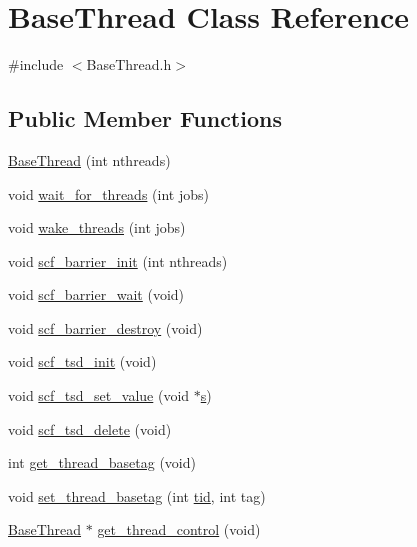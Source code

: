\hypertarget{class_base_thread}{\section{Base\-Thread Class Reference}
\label{class_base_thread}
}


{\ttfamily \#include $<$Base\-Thread.\-h$>$}

\subsection*{Public Member Functions}
\begin{DoxyCompactItemize}
\item 
\hyperlink{class_base_thread_a2496ab7dd9e8aa2bde8709fea2ed0dce}{Base\-Thread} (int nthreads)
\item 
void \hyperlink{class_base_thread_a84da2cf16b7c961408fc918e570af25b}{wait\-\_\-for\-\_\-threads} (int jobs)
\item 
void \hyperlink{class_base_thread_a197bd8968933e01c59c1be78b8e1c4ec}{wake\-\_\-threads} (int jobs)
\item 
void \hyperlink{class_base_thread_a06cab1e53ad7443ddbcbc0115cf3694b}{scf\-\_\-barrier\-\_\-init} (int nthreads)
\item 
void \hyperlink{class_base_thread_a4273b3cfab78ed0653c546fb319bd7ba}{scf\-\_\-barrier\-\_\-wait} (void)
\item 
void \hyperlink{class_base_thread_a39166fc96cb44bcdc079ed988d7c9944}{scf\-\_\-barrier\-\_\-destroy} (void)
\item 
void \hyperlink{class_base_thread_aedba8eb36afb4458d3fd1fd60560de28}{scf\-\_\-tsd\-\_\-init} (void)
\item 
void \hyperlink{class_base_thread_a56e6092609219fde2a1207210e9dc890}{scf\-\_\-tsd\-\_\-set\-\_\-value} (void $\ast$\hyperlink{_t_d_d_f_t_2_common_2init__wf__gaussian_8c_ac9562ee4ecb3b8aeebeb04656e7e57a9}{s})
\item 
void \hyperlink{class_base_thread_ac63a5f3c5f7a8f67f8ac7919ec9971ef}{scf\-\_\-tsd\-\_\-delete} (void)
\item 
int \hyperlink{class_base_thread_ae38c5f1a361e8342630cf0193f8a2d6b}{get\-\_\-thread\-\_\-basetag} (void)
\item 
void \hyperlink{class_base_thread_a30c8cbc148d172aff2f2d3b0ebf4ff14}{set\-\_\-thread\-\_\-basetag} (int \hyperlink{class_base_thread_a98cb2fa092cfd40fcdc3992096e58db8}{tid}, int tag)
\item 
\hyperlink{class_base_thread}{Base\-Thread} $\ast$ \hyperlink{class_base_thread_afdcaf00c72f5088f384825fcce93da9e}{get\-\_\-thread\-\_\-control} (void)

\end{DoxyCompactItemize}
